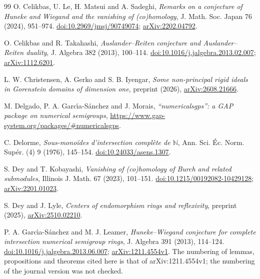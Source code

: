 \documentclass[11pt]{article}
\theoremstyle{definition}
\theoremstyle{remark}
\newcommand{\N}{\mathbb{N}}
\begin{document}
{\begin{thebibliography}{99}
O. Celikbas, U. Le, H. Matsui and A. Sadeghi,
\emph{Remarks on a conjecture of Huneke and Wiegand and the vanishing of (co)homology},
J. Math. Soc. Japan 76 (2024), 951--974.
\href{https://doi.org/10.2969/jmsj/90749074}{doi:10.2969/jmsj/90749074};
\href{https://arxiv.org/abs/2202.04792}{arXiv:2202.04792}.

O. Celikbas and R. Takahashi,
\emph{Auslander--Reiten conjecture and Auslander--Reiten duality},
J. Algebra 382 (2013), 100--114.
\href{https://doi.org/10.1016/j.jalgebra.2013.02.007}{doi:10.1016/j.jalgebra.2013.02.007};
\href{https://arxiv.org/abs/1112.6201}{arXiv:1112.6201}.

L. W. Christensen, A. Gerko and S. B. Iyengar,
\emph{Some non-principal rigid ideals in Gorenstein domains of dimension one},
preprint (2026), \href{https://arxiv.org/abs/2608.21666}{arXiv:2608.21666}.

M. Delgado, P. A. Garc\'{\i}a-S\'anchez and J. Morais,
\emph{``numericalsgps'': a GAP package on numerical semigroups},
\url{https://www.gap-system.org/packages/#numericalsgps}.

C. Delorme,
\emph{Sous-mono\"ides d'intersection compl\`ete de $\N$},
Ann. Sci. \'Ec. Norm. Sup\'er. (4) 9 (1976), 145--154.
\href{https://doi.org/10.24033/asens.1307}{doi:10.24033/asens.1307}.

S. Dey and T. Kobayashi,
\emph{Vanishing of (co)homology of Burch and related submodules},
Illinois J. Math. 67 (2023), 101--151.
\href{https://doi.org/10.1215/00192082-10429128}{doi:10.1215/00192082-10429128};
\href{https://arxiv.org/abs/2201.01023}{arXiv:2201.01023}.

S. Dey and J. Lyle,
\emph{Centers of endomorphism rings and reflexivity},
preprint (2025), \href{https://arxiv.org/abs/2510.02210}{arXiv:2510.02210}.

P. A. Garc\'{\i}a-S\'anchez and M. J. Leamer,
\emph{Huneke--Wiegand conjecture for complete intersection numerical semigroup rings},
J. Algebra 391 (2013), 114--124.
\href{https://doi.org/10.1016/j.jalgebra.2013.06.007}{doi:10.1016/j.jalgebra.2013.06.007};
\href{https://arxiv.org/abs/1211.4554}{arXiv:1211.4554v1}. The numbering of lemmas, propositions and theorems cited here is that of
arXiv:1211.4554v1; the numbering of the journal version was not checked.


\end{thebibliography}}
\end{document}
